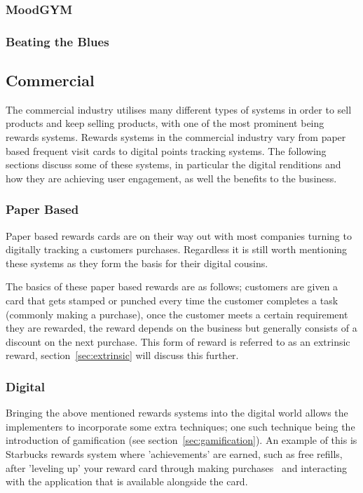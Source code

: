 \documentclass[a4paper,12pt]{article}
\begin{document}
\subsubsection{MoodGYM}

\subsubsection{Beating the Blues}


\subsection{Commercial}
The commercial industry utilises many different types of systems in order to sell products and keep selling products, with one of the most prominent being rewards systems. 
Rewards systems in the commercial industry vary from paper based frequent visit cards to digital points tracking systems. 
The following sections discuss some of these systems, in particular the digital renditions and how they are achieving user engagement, as well the benefits to the business.

\subsubsection{Paper Based}
Paper based rewards cards are on their way out with most companies turning to digitally tracking a customers purchases. 
Regardless it is still worth mentioning these systems as they form the basis for their digital cousins.

\par
The basics of these paper based rewards are as follows; customers are given a card that gets stamped or punched every time the customer completes a task (commonly making a purchase), once the customer meets a certain requirement they are rewarded, the reward depends on the business but generally consists of a discount on the next purchase. 
This form of reward is referred to as an extrinsic reward, section~\ref{sec:extrinsic} will discuss this further.

\subsubsection{Digital}
Bringing the above mentioned rewards systems into the digital world allows the implementers to incorporate some extra techniques; one such technique being the introduction of gamification (see section~\ref{sec:gamification}). 
An example of this is Starbucks rewards system where 'achievements' are earned, such as free refills, after 'leveling up' your reward card through making purchases~\citep{gamifying-intelligent-environments} and interacting with the application that is available alongside the card.
\end{document}
